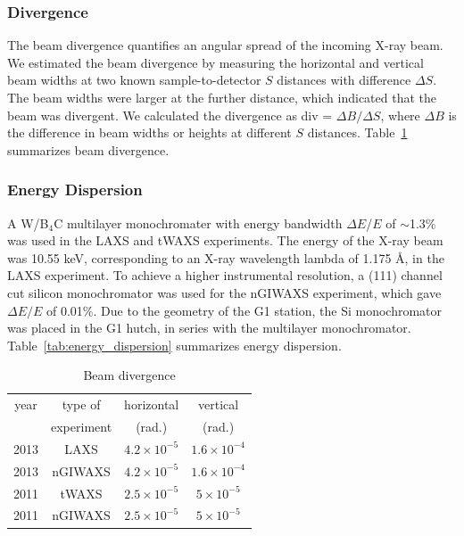 \subsubsection{Divergence}\label{sec:divergence}
The beam divergence quantifies an angular spread of the incoming X-ray
beam. We estimated the beam divergence by measuring the horizontal and 
vertical beam widths at two known sample-to-detector $S$ distances
with difference $\Delta S$. 
The beam widths were larger at the further distance, which indicated 
that the beam was divergent. 
We calculated the divergence as div = $\Delta B/\Delta S$, where
$\Delta B$ is the difference in beam widths or heights 
at different $S$ distances.
Table~\ref{tab:beam_divergence} summarizes beam divergence.

\subsubsection{Energy Dispersion}\label{sec:energy_dispersion}
A W/B$_4$C multilayer monochromater with energy bandwidth $\Delta E$/$E$ of
$\sim$1.3\% was used in the LAXS and tWAXS experiments. 
The energy of the X-ray beam was 10.55 keV, corresponding to an X-ray wavelength 
\gls{lambda} of 1.175 \AA, in the LAXS experiment.
To achieve a higher instrumental resolution, 
a (111) channel cut silicon monochromator was used for 
the nGIWAXS experiment, which gave $\Delta E/E$ of 0.01\%.
Due to the geometry of the G1 station, the Si monochromator was placed in
the G1 hutch, in series with the multilayer monochromator. 
Table~\ref{tab:energy_dispersion} summarizes energy dispersion.

\begin{table}[htbp]
  \centering
  \begin{tabular}{cccc}
    \hline
    year & type of  & horizontal & vertical \\
     & experiment & (rad.) & (rad.) \\
    \hline
    2013 & LAXS & $4.2 \times 10^{-5}$ & $1.6 \times 10^{-4}$ \\
    2013 & nGIWAXS & $4.2 \times 10^{-5}$ & $1.6 \times 10^{-4}$ \\
    2011 & tWAXS & $2.5 \times 10^{-5}$ & $5 \times 10^{-5}$ \\
    2011 & nGIWAXS & $2.5 \times 10^{-5}$ & $5 \times 10^{-5}$ \\
    \hline
  \end{tabular}
  \caption[Beam divergence]
  {Beam divergence}
  \label{tab:beam_divergence}
\end{table}


